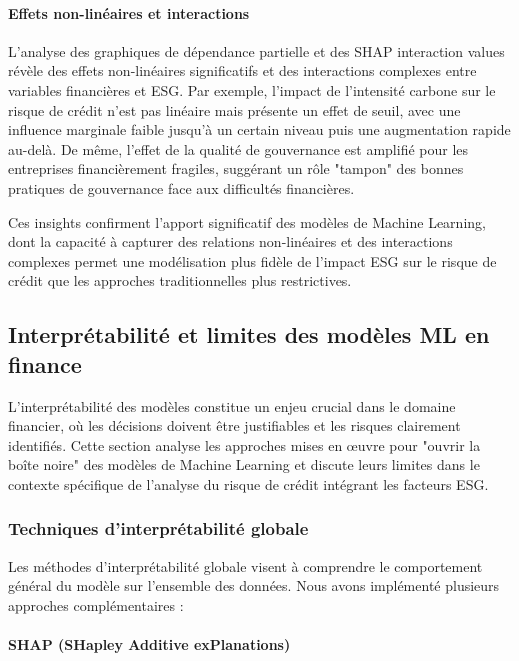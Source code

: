 \paragraph{Effets non-linéaires et interactions} L'analyse des graphiques de dépendance partielle et des SHAP interaction values révèle des effets non-linéaires significatifs et des interactions complexes entre variables financières et ESG. Par exemple, l'impact de l'intensité carbone sur le risque de crédit n'est pas linéaire mais présente un effet de seuil, avec une influence marginale faible jusqu'à un certain niveau puis une augmentation rapide au-delà. De même, l'effet de la qualité de gouvernance est amplifié pour les entreprises financièrement fragiles, suggérant un rôle "tampon" des bonnes pratiques de gouvernance face aux difficultés financières.

Ces insights confirment l'apport significatif des modèles de Machine Learning, dont la capacité à capturer des relations non-linéaires et des interactions complexes permet une modélisation plus fidèle de l'impact ESG sur le risque de crédit que les approches traditionnelles plus restrictives.

\subsection{Interprétabilité et limites des modèles ML en finance}

L'interprétabilité des modèles constitue un enjeu crucial dans le domaine financier, où les décisions doivent être justifiables et les risques clairement identifiés. Cette section analyse les approches mises en œuvre pour "ouvrir la boîte noire" des modèles de Machine Learning et discute leurs limites dans le contexte spécifique de l'analyse du risque de crédit intégrant les facteurs ESG.

\subsubsection{Techniques d'interprétabilité globale}

Les méthodes d'interprétabilité globale visent à comprendre le comportement général du modèle sur l'ensemble des données. Nous avons implémenté plusieurs approches complémentaires :

\paragraph{SHAP (SHapley Additive exPlanations)} 

